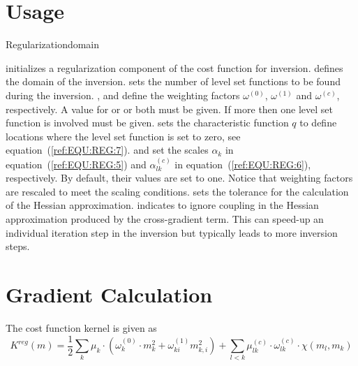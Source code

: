\section{Usage}


\begin{classdesc}{Regularization}{domain
        }

  
initializes a regularization component of the cost function for inversion. 
 defines the domain of the inversion. 
sets the number of level set functions to be found during the inversion. 
,  and   define the weighting factors
$\omega^{(0)}$,
$\omega^{(1)}$ and
$\omega^{(c)}$, respectively. A value for  or  or both must be given. 
If more then one level set function is involved   must be given. 
 sets the characteristic function $q$ 
to define locations where the level set function is set to zero, see equation~(\ref{ref:EQU:REG:7}).
 and 
 set the scales $\alpha_k$ in equation~(\ref{ref:EQU:REG:5}) and
$\alpha^{(c)}_{lk}$ in equation~(\ref{ref:EQU:REG:6}), respectively. By default, their values are set to one.
Notice that weighting factors are rescaled to meet the scaling conditions.  sets the 
tolerance for the calculation of the Hessian approximation.  
indicates to ignore coupling in the Hessian approximation produced by the 
cross-gradient term. This can speed-up an individual iteration step in the inversion but typically leads to more
inversion steps.
\end{classdesc}

\section{Gradient Calculation}


The cost function kernel is given as
\begin{equation}\label{ref:EQU:REG:100}
K^{reg}(m) = \frac{1}{2}
\sum_{k} \mu_k \cdot ( \omega^{(0)}_k \cdot m_k^2 + \omega^{(1)}_{ki}m_{k,i}^2 ) 
+  \sum_{l<k} \mu^{(c)}_{lk} \cdot \omega^{(c)}_{lk}  \cdot  \chi(m_l,m_k)
\end{equation} 

